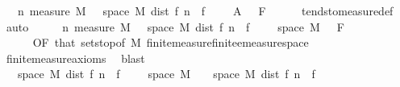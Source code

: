 \begin{isabellebody}
\ \ \ {\isacharparenleft}{\kern0pt}{\isacharparenleft}{\kern0pt}{\isasymlambda}n{\isachardot}{\kern0pt}\ measure\ M\ {\isacharparenleft}{\kern0pt}{\isacharbraceleft}{\kern0pt}{\isasymomega}\ {\isasymin}\ space\ M{\isachardot}{\kern0pt}\ dist\ {\isacharparenleft}{\kern0pt}f{\isacharprime}{\kern0pt}\ n\ {\isasymomega}{\isacharparenright}{\kern0pt}\ {\isacharparenleft}{\kern0pt}f\ {\isasymomega}{\isacharparenright}{\kern0pt}\ {\isachargreater}{\kern0pt}\ {\isasymepsilon}{\isacharbraceright}{\kern0pt}\ {\isasyminter}\ A{\isacharparenright}{\kern0pt}{\isacharparenright}{\kern0pt}\ {\isasymlonglongrightarrow}\ {}{\isacharparenright}{\kern0pt}\ F{\isachardoublequoteclose}\isanewline
\ \ \ \ \isamarkupfalse%
\ tendsto{\isacharunderscore}{\kern0pt}measure{\isacharunderscore}{\kern0pt}def\ \isamarkupfalse%
\ auto\isanewline
\ \ \isamarkupfalse%
\ \isamarkupfalse%
\ {\isachardoublequoteopen}{\isacharparenleft}{\kern0pt}{\isacharparenleft}{\kern0pt}{\isasymlambda}n{\isachardot}{\kern0pt}\ measure\ M\ {\isacharparenleft}{\kern0pt}{\isacharbraceleft}{\kern0pt}{\isasymomega}\ {\isasymin}\ space\ M{\isachardot}{\kern0pt}\ dist\ {\isacharparenleft}{\kern0pt}f{\isacharprime}{\kern0pt}\ n\ {\isasymomega}{\isacharparenright}{\kern0pt}\ {\isacharparenleft}{\kern0pt}f\ {\isasymomega}{\isacharparenright}{\kern0pt}\ {\isachargreater}{\kern0pt}\ {\isasymepsilon}{\isacharbraceright}{\kern0pt}\ {\isasyminter}\ space\ M{\isacharparenright}{\kern0pt}{\isacharparenright}{\kern0pt}\ {\isasymlonglongrightarrow}\ {}{\isacharparenright}{\kern0pt}\ F{\isachardoublequoteclose}\isanewline
\ \ \ \ \ {\isachardoublequoteopen}{\isasymepsilon}\ {\isachargreater}{\kern0pt}\ {}{\isachardoublequoteclose}\ \ {\isasymepsilon}\isanewline
\ \ \ \ \isamarkupfalse%
\ {\isacharasterisk}{\kern0pt}{\isacharbrackleft}{\kern0pt}OF\ that\ sets{\isachardot}{\kern0pt}top{\isacharbrackleft}{\kern0pt}of\ M{\isacharbrackright}{\kern0pt}\ finite{\isacharunderscore}{\kern0pt}measure{\isachardot}{\kern0pt}finite{\isacharunderscore}{\kern0pt}emeasure{\isacharunderscore}{\kern0pt}space{\isacharbrackright}{\kern0pt}\isanewline
\ \ \ \ \isamarkupfalse%
\ finite{\isacharunderscore}{\kern0pt}measure{\isacharunderscore}{\kern0pt}axioms\ \isamarkupfalse%
\ blast\isanewline
\ \ \isamarkupfalse%
\ \isamarkupfalse%
\ {\isachardoublequoteopen}{\isacharbraceleft}{\kern0pt}{\isasymomega}\ {\isasymin}\ space\ M{\isachardot}{\kern0pt}\ dist\ {\isacharparenleft}{\kern0pt}f{\isacharprime}{\kern0pt}\ n\ {\isasymomega}{\isacharparenright}{\kern0pt}\ {\isacharparenleft}{\kern0pt}f\ {\isasymomega}{\isacharparenright}{\kern0pt}\ {\isachargreater}{\kern0pt}\ {\isasymepsilon}{\isacharbraceright}{\kern0pt}\ {\isasyminter}\ space\ M\ {\isacharequal}{\kern0pt}\ {\isacharbraceleft}{\kern0pt}{\isasymomega}\ {\isasymin}\ space\ M{\isachardot}{\kern0pt}\ dist\ {\isacharparenleft}{\kern0pt}f{\isacharprime}{\kern0pt}\ n\ {\isasymomega}{\isacharparenright}{\kern0pt}\ {\isacharparenleft}{\kern0pt}f\ {\isasymomega}{\isacharparenright}{\kern0pt}\ {\isachargreater}{\kern0pt}\ {\isasymepsilon}{\isacharbraceright}{\kern0pt}{\isachardoublequoteclose}\isanewline

\end{isabellebody}

